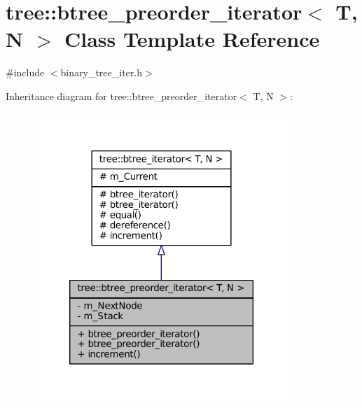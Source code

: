 \hypertarget{classtree_1_1btree__preorder__iterator}{\section{tree\-:\-:btree\-\_\-preorder\-\_\-iterator$<$ \-T, \-N $>$ \-Class \-Template \-Reference}
\label{classtree_1_1btree__preorder__iterator}
}


{\ttfamily \#include $<$binary\-\_\-tree\-\_\-iter.\-h$>$}



\-Inheritance diagram for tree\-:\-:btree\-\_\-preorder\-\_\-iterator$<$ \-T, \-N $>$\-:
\nopagebreak
\begin{figure}[H]
\begin{center}
\leavevmode
\includegraphics[width=274pt]{classtree_1_1btree__preorder__iterator__inherit__graph}
\end{center}
\end{figure}



